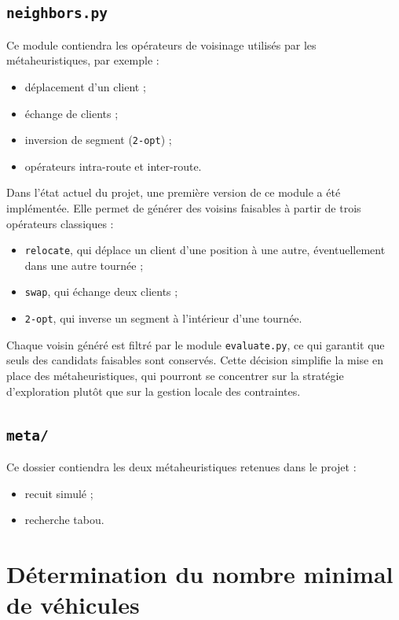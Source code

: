 \documentclass[11pt,a4paper]{article}
\begin{document}
\subsection{\texttt{neighbors.py}}
Ce module contiendra les opérateurs de voisinage utilisés par les métaheuristiques, par exemple :
\begin{itemize}
    \item déplacement d'un client ;
    \item échange de clients ;
    \item inversion de segment (\texttt{2-opt}) ;
    \item opérateurs intra-route et inter-route.
\end{itemize}

Dans l'état actuel du projet, une première version de ce module a été implémentée. Elle permet de générer des voisins faisables à partir de trois opérateurs classiques :
\begin{itemize}
    \item \texttt{relocate}, qui déplace un client d'une position à une autre, éventuellement dans une autre tournée ;
    \item \texttt{swap}, qui échange deux clients ;
    \item \texttt{2-opt}, qui inverse un segment à l'intérieur d'une tournée.
\end{itemize}

Chaque voisin généré est filtré par le module \texttt{evaluate.py}, ce qui garantit que seuls des candidats faisables sont conservés. Cette décision simplifie la mise en place des métaheuristiques, qui pourront se concentrer sur la stratégie d'exploration plutôt que sur la gestion locale des contraintes.

\subsection{\texttt{meta/}}
Ce dossier contiendra les deux métaheuristiques retenues dans le projet :
\begin{itemize}
    \item recuit simulé ;
    \item recherche tabou.
\end{itemize}

\section{Détermination du nombre minimal de véhicules}
\end{document}
